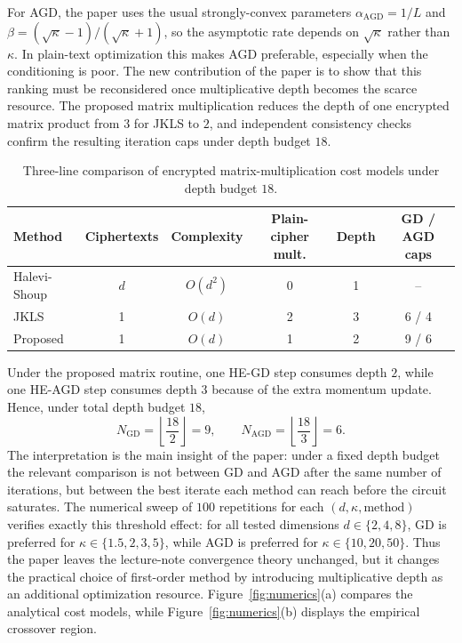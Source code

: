 \documentclass[10pt,english]{article}
\begin{document}
For AGD, the paper uses the usual strongly-convex parameters $\alpha_{\mathrm{AGD}}=1/L$ and $\beta=(\sqrt{\kappa}-1)/(\sqrt{\kappa}+1)$, so the asymptotic rate depends on $\sqrt{\kappa}$ rather than $\kappa$. In plain-text optimization this makes AGD preferable, especially when the conditioning is poor. The new contribution of the paper is to show that this ranking must be reconsidered once multiplicative depth becomes the scarce resource. The proposed matrix multiplication reduces the depth of one encrypted matrix product from $3$ for JKLS to $2$, and independent consistency checks confirm the resulting iteration caps under depth budget $18$.

\begin{table}[H]
\centering
\small
\begin{threeparttable}
\caption{Three-line comparison of encrypted matrix-multiplication cost models under depth budget $18$.}
\label{tab:mmult-costs}
\begin{tabular}{lccccc}
\toprule
Method & Ciphertexts & Complexity & Plain-cipher mult. & Depth & GD / AGD caps \\
\midrule
Halevi-Shoup & $d$ & $O(d^2)$ & 0 & 1 & -- \\
JKLS & 1 & $O(d)$ & 2 & 3 & 6 / 4 \\
Proposed & 1 & $O(d)$ & 1 & 2 & 9 / 6 \\
\bottomrule
\end{tabular}
\end{threeparttable}
\normalsize
\end{table}

Under the proposed matrix routine, one HE-GD step consumes depth $2$, while one HE-AGD step consumes depth $3$ because of the extra momentum update. Hence, under total depth budget $18$,
\[
N_{\mathrm{GD}}=\left\lfloor\frac{18}{2}\right\rfloor=9,
\qquad
N_{\mathrm{AGD}}=\left\lfloor\frac{18}{3}\right\rfloor=6.
\]
The interpretation is the main insight of the paper: under a fixed depth budget the relevant comparison is not between GD and AGD after the same number of iterations, but between the best iterate each method can reach before the circuit saturates. The numerical sweep of $100$ repetitions for each $(d,\kappa,\text{method})$ verifies exactly this threshold effect: for all tested dimensions $d \in \{2,4,8\}$, GD is preferred for $\kappa \in \{1.5,2,3,5\}$, while AGD is preferred for $\kappa \in \{10,20,50\}$. Thus the paper leaves the lecture-note convergence theory unchanged, but it changes the practical choice of first-order method by introducing multiplicative depth as an additional optimization resource. Figure~\ref{fig:numerics}(a) compares the analytical cost models, while Figure~\ref{fig:numerics}(b) displays the empirical crossover region.
\end{document}
